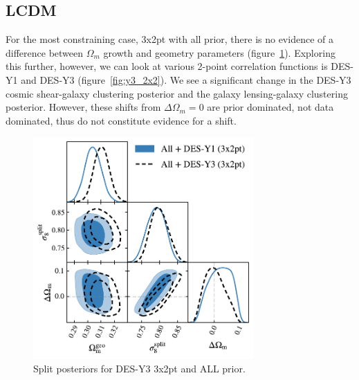 \subsection{LCDM}
For the most constraining case, 3x2pt with all prior, there is no evidence of a difference between $\Omega_m$ growth and geometry parameters (figure~\ref{fig:y3_3x2_all}). Exploring this further, however, we can look at various 2-point correlation functions is DES-Y1 and DES-Y3 (figure~\ref{fig:y3_2x2}). We see a significant change in the DES-Y3 cosmic shear-galaxy clustering posterior and the galaxy lensing-galaxy clustering posterior. However, these shifts from $\Delta\Omega_m=0$ are prior dominated, not data dominated, thus do not constitute evidence for a shift.
\begin{figure}[ht]
	\centering
	\includegraphics[width=0.75\textwidth]{plots/plot204_v2.pdf}
	\caption{Split posteriors for DES-Y3 3x2pt and ALL prior.}
	\label{fig:y3_3x2_all}
\end{figure}

